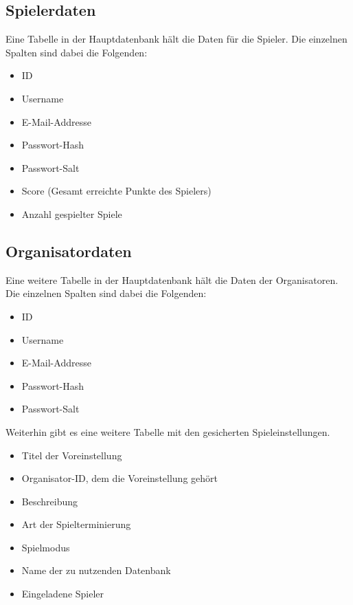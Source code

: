 \documentclass[a4paper]{scrreprt}
\begin{document}
	\subsection{Spielerdaten}
	Eine Tabelle in der Hauptdatenbank hält die Daten für die Spieler.
	Die einzelnen Spalten sind dabei die Folgenden:
	\begin{itemize}
		\item ID
		\item Username
		\item E-Mail-Addresse
		\item Passwort-Hash
		\item Passwort-Salt
		\item Score (Gesamt erreichte Punkte des Spielers)
		\item Anzahl gespielter Spiele
	\end{itemize}
	\subsection{Organisatordaten}
	Eine weitere Tabelle in der Hauptdatenbank hält die Daten der Organisatoren.
	Die einzelnen Spalten sind dabei die Folgenden:
	\begin{itemize}
		\item ID
		\item Username
		\item E-Mail-Addresse
		\item Passwort-Hash
		\item Passwort-Salt
	\end{itemize}
	Weiterhin gibt es eine weitere Tabelle mit den gesicherten Spieleinstellungen.
	\begin{itemize}
		\item Titel der Voreinstellung
		\item Organisator-ID, dem die Voreinstellung gehört
		\item Beschreibung
		\item Art der Spielterminierung
		\item Spielmodus
		\item Name der zu nutzenden Datenbank
		\item Eingeladene Spieler
	\end{itemize}
\end{document}
